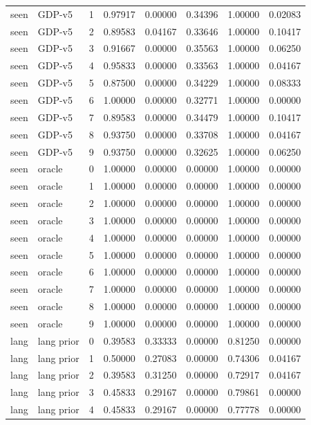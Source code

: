 \documentclass{article}
\begin{document}
\begin{center}
\begin{longtable}{llllllll}
seen & GDP-v5 & 1 & 0.97917 & 0.00000 & 0.34396 & 1.00000 & 0.02083 \\
seen & GDP-v5 & 2 & 0.89583 & 0.04167 & 0.33646 & 1.00000 & 0.10417 \\
seen & GDP-v5 & 3 & 0.91667 & 0.00000 & 0.35563 & 1.00000 & 0.06250 \\
seen & GDP-v5 & 4 & 0.95833 & 0.00000 & 0.33563 & 1.00000 & 0.04167 \\
seen & GDP-v5 & 5 & 0.87500 & 0.00000 & 0.34229 & 1.00000 & 0.08333 \\
seen & GDP-v5 & 6 & 1.00000 & 0.00000 & 0.32771 & 1.00000 & 0.00000 \\
seen & GDP-v5 & 7 & 0.89583 & 0.00000 & 0.34479 & 1.00000 & 0.10417 \\
seen & GDP-v5 & 8 & 0.93750 & 0.00000 & 0.33708 & 1.00000 & 0.04167 \\
seen & GDP-v5 & 9 & 0.93750 & 0.00000 & 0.32625 & 1.00000 & 0.06250 \\
seen & oracle & 0 & 1.00000 & 0.00000 & 0.00000 & 1.00000 & 0.00000 \\
seen & oracle & 1 & 1.00000 & 0.00000 & 0.00000 & 1.00000 & 0.00000 \\
seen & oracle & 2 & 1.00000 & 0.00000 & 0.00000 & 1.00000 & 0.00000 \\
seen & oracle & 3 & 1.00000 & 0.00000 & 0.00000 & 1.00000 & 0.00000 \\
seen & oracle & 4 & 1.00000 & 0.00000 & 0.00000 & 1.00000 & 0.00000 \\
seen & oracle & 5 & 1.00000 & 0.00000 & 0.00000 & 1.00000 & 0.00000 \\
seen & oracle & 6 & 1.00000 & 0.00000 & 0.00000 & 1.00000 & 0.00000 \\
seen & oracle & 7 & 1.00000 & 0.00000 & 0.00000 & 1.00000 & 0.00000 \\
seen & oracle & 8 & 1.00000 & 0.00000 & 0.00000 & 1.00000 & 0.00000 \\
seen & oracle & 9 & 1.00000 & 0.00000 & 0.00000 & 1.00000 & 0.00000 \\
lang & lang prior & 0 & 0.39583 & 0.33333 & 0.00000 & 0.81250 & 0.00000 \\
lang & lang prior & 1 & 0.50000 & 0.27083 & 0.00000 & 0.74306 & 0.04167 \\
lang & lang prior & 2 & 0.39583 & 0.31250 & 0.00000 & 0.72917 & 0.04167 \\
lang & lang prior & 3 & 0.45833 & 0.29167 & 0.00000 & 0.79861 & 0.00000 \\
lang & lang prior & 4 & 0.45833 & 0.29167 & 0.00000 & 0.77778 & 0.00000 \\

\end{longtable}
\end{center}
\end{document}
